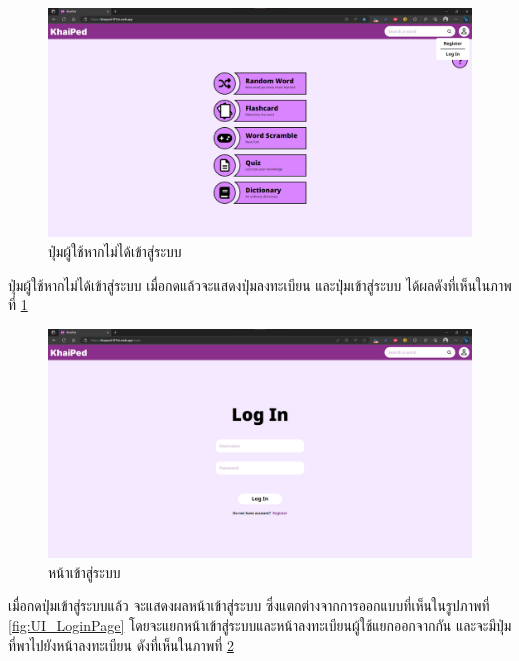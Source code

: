\documentclass[12pt,oneside,openright,a4paper]{cpe-thai-project}
\begin{document}
\pagebreak
\begin{figure}[!h]\centering
	\includegraphics[width=\textwidth, keepaspectratio=true]{image/chap4/UI/home/guest button.png}
	\caption{{ปุ่มผู้ใช้หากไม่ได้เข้าสู่ระบบ}}\label{fig:chap4UIGuestButton}
\end{figure}
\hspace{1cm}
ปุ่มผู้ใช้หากไม่ได้เข้าสู่ระบบ เมื่อกดแล้วจะแสดงปุ่มลงทะเบียน และปุ่มเข้าสู่ระบบ ได้ผลดังที่เห็นในภาพที่ \ref{fig:chap4UIGuestButton}

\begin{figure}[!h]\centering
	\includegraphics[width=\textwidth, keepaspectratio=true]{image/chap4/UI/login/login.png}
	\caption{{หน้าเข้าสู่ระบบ}}\label{fig:chap4UILogIn}
\end{figure}
\hspace{1cm}
เมื่อกดปุ่มเข้าสู่ระบบแล้ว จะแสดงผลหน้าเข้าสู่ระบบ ซึ่งแตกต่างจากการออกแบบที่เห็นในรูปภาพที่ \ref{fig:UI_LoginPage}
โดยจะแยกหน้าเข้าสู่ระบบและหน้าลงทะเบียนผู้ใช้แยกออกจากกัน และจะมีปุ่มที่พาไปยังหน้าลงทะเบียน ดังที่เห็นในภาพที่ \ref{fig:chap4UILogIn}
\end{document}
